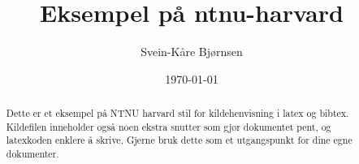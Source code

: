 \documentclass[norsk, a4paper, 11pt]{article}
\title{Eksempel på ntnu-harvard}
\author{Svein-Kåre Bjørnsen}
\date{\today}
\begin{document}
\maketitle

\begin{abstract}
Dette er et eksempel på NTNU harvard stil for kildehenvisning i latex og bibtex. 
Kildefilen inneholder også noen ekstra snutter som gjør dokumentet pent, og latexkoden enklere å skrive.
Gjerne bruk dette som et utgangspunkt for dine egne dokumenter.
\end{abstract}




\end{document}
